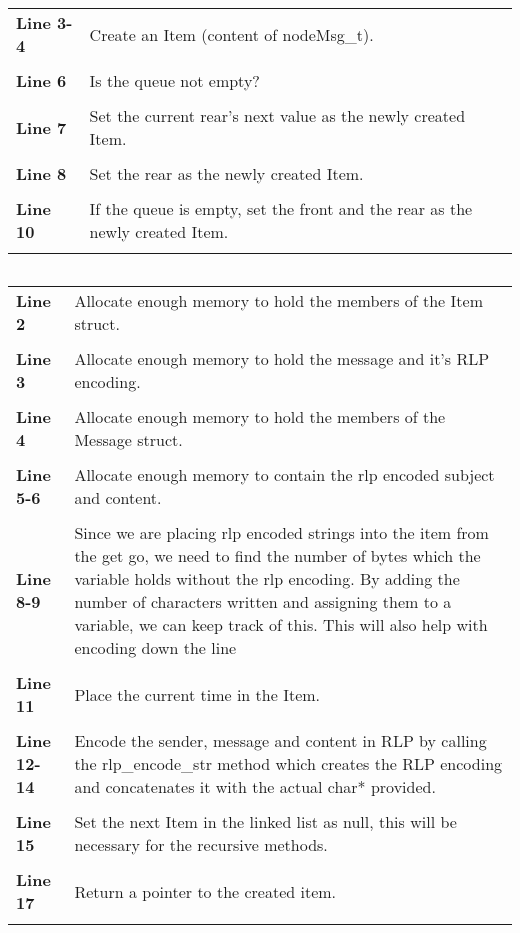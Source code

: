 \documentclass[a4paper, 12pt, titlepage]{article}
\newenvironment{code}{\captionsetup{type=listing}}{}
\newcommand{\sourcecode}[3]{
    \begin{code}
      \inputminted[linenos,numbersep=5pt,gobble=0,frame=lines,framesep=2mm,]{c}{#1}
        \caption{#2}
        \label{lst: #3}
    \end{code}
  }
\newcommand{\explainline}[2]{
  \textbf{Line #1} & #2 \\ \\
}
\begin{document}
\begin{onehalfspacing}
   \begin{longtable}{l p{10cm}}
     \explainline{3-4}{Create an Item (content of nodeMsg\_t).}

     \explainline{6}{Is the queue not empty?}

     \explainline{7}{Set the current rear's next value as the newly created Item. }

     \explainline{8}{Set the rear as the newly created Item.}

     \explainline{10}{If the queue is empty, set the front and the rear as the newly created Item.}

   \end{longtable}

   \clearpage

   \sourcecode{snippets/task2b/create_item.c}{create\_item helper function}{create_item}

   \begin{longtable}{l p{10cm}}
     \explainline{2}{Allocate enough memory to hold the members of the Item struct.}

     \explainline{3}{Allocate enough memory to hold the message and it's RLP encoding.}

     \explainline{4}{Allocate enough memory to hold the members of the Message struct. }

     \explainline{5-6}{Allocate enough memory to contain the rlp encoded subject and content.}

     \explainline{8-9}{Since we are placing rlp encoded strings into the item from the get go, we need to find the number of bytes which the variable holds without the rlp encoding. By adding the number of characters written and assigning them to a variable, we can keep track of this. This will also help with encoding down the line}

     \explainline{11}{Place the current time in the Item.}

     \explainline{12-14}{Encode the sender, message and content in RLP by calling the rlp\_encode\_str method which creates the RLP encoding and concatenates it with the actual char* provided.}

     \explainline{15}{Set the next Item in the linked list as null, this will be necessary for the recursive methods. }


     \explainline{17}{Return a pointer to the created item. }

   \end{longtable}

   \clearpage


\end{onehalfspacing}
\end{document}
